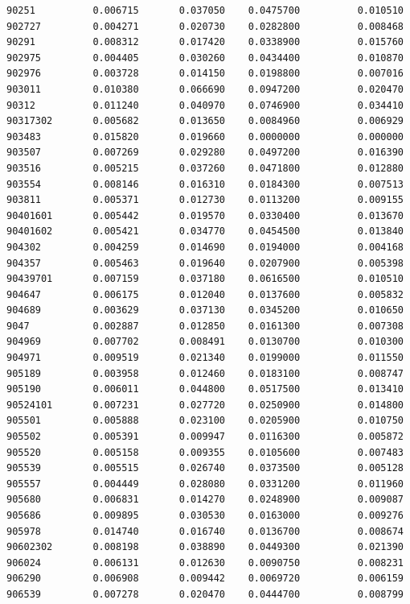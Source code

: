 \documentclass[
  letterpaper,
  DIV=11,
  numbers=noendperiod]{scrartcl}
\begin{document}
\begin{verbatim}
90251          0.006715       0.037050    0.0475700          0.010510
902727         0.004271       0.020730    0.0282800          0.008468
90291          0.008312       0.017420    0.0338900          0.015760
902975         0.004405       0.030260    0.0434400          0.010870
902976         0.003728       0.014150    0.0198800          0.007016
903011         0.010380       0.066690    0.0947200          0.020470
90312          0.011240       0.040970    0.0746900          0.034410
90317302       0.005682       0.013650    0.0084960          0.006929
903483         0.015820       0.019660    0.0000000          0.000000
903507         0.007269       0.029280    0.0497200          0.016390
903516         0.005215       0.037260    0.0471800          0.012880
903554         0.008146       0.016310    0.0184300          0.007513
903811         0.005371       0.012730    0.0113200          0.009155
90401601       0.005442       0.019570    0.0330400          0.013670
90401602       0.005421       0.034770    0.0454500          0.013840
904302         0.004259       0.014690    0.0194000          0.004168
904357         0.005463       0.019640    0.0207900          0.005398
90439701       0.007159       0.037180    0.0616500          0.010510
904647         0.006175       0.012040    0.0137600          0.005832
904689         0.003629       0.037130    0.0345200          0.010650
9047           0.002887       0.012850    0.0161300          0.007308
904969         0.007702       0.008491    0.0130700          0.010300
904971         0.009519       0.021340    0.0199000          0.011550
905189         0.003958       0.012460    0.0183100          0.008747
905190         0.006011       0.044800    0.0517500          0.013410
90524101       0.007231       0.027720    0.0250900          0.014800
905501         0.005888       0.023100    0.0205900          0.010750
905502         0.005391       0.009947    0.0116300          0.005872
905520         0.005158       0.009355    0.0105600          0.007483
905539         0.005515       0.026740    0.0373500          0.005128
905557         0.004449       0.028080    0.0331200          0.011960
905680         0.006831       0.014270    0.0248900          0.009087
905686         0.009895       0.030530    0.0163000          0.009276
905978         0.014740       0.016740    0.0136700          0.008674
90602302       0.008198       0.038890    0.0449300          0.021390
906024         0.006131       0.012630    0.0090750          0.008231
906290         0.006908       0.009442    0.0069720          0.006159
906539         0.007278       0.020470    0.0444700          0.008799

\end{verbatim}
\end{document}
